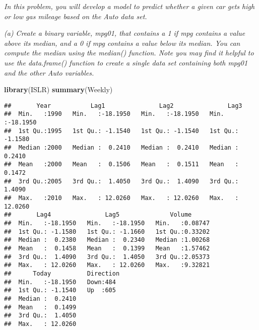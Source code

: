 \documentclass[]{article}
\newenvironment{Shaded}{\begin{snugshade}}{\end{snugshade}}
\newcommand{\KeywordTok}[1]{\textcolor[rgb]{0.13,0.29,0.53}{\textbf{#1}}}
\newcommand{\DecValTok}[1]{\textcolor[rgb]{0.00,0.00,0.81}{#1}}
\newcommand{\StringTok}[1]{\textcolor[rgb]{0.31,0.60,0.02}{#1}}
\newcommand{\OperatorTok}[1]{\textcolor[rgb]{0.81,0.36,0.00}{\textbf{#1}}}
\newcommand{\NormalTok}[1]{#1}
\begin{document}
 \emph{In this problem, you will develop a model to predict whether a
given car gets high or low gas mileage based on the Auto data set.}

\emph{(a) Create a binary variable, mpg01, that contains a 1 if mpg
contains a value above its median, and a 0 if mpg contains a value below
its median. You can compute the median using the median() function. Note
you may find it helpful to use the data.frame() function to create a
single data set containing both mpg01 and the other Auto variables.}

\begin{Shaded}
\begin{Highlighting}[]
\KeywordTok{library}\NormalTok{(ISLR)}
\KeywordTok{summary}\NormalTok{(Weekly)}
\end{Highlighting}
\end{Shaded}

\begin{verbatim}
##       Year           Lag1               Lag2               Lag3         
##  Min.   :1990   Min.   :-18.1950   Min.   :-18.1950   Min.   :-18.1950  
##  1st Qu.:1995   1st Qu.: -1.1540   1st Qu.: -1.1540   1st Qu.: -1.1580  
##  Median :2000   Median :  0.2410   Median :  0.2410   Median :  0.2410  
##  Mean   :2000   Mean   :  0.1506   Mean   :  0.1511   Mean   :  0.1472  
##  3rd Qu.:2005   3rd Qu.:  1.4050   3rd Qu.:  1.4090   3rd Qu.:  1.4090  
##  Max.   :2010   Max.   : 12.0260   Max.   : 12.0260   Max.   : 12.0260  
##       Lag4               Lag5              Volume       
##  Min.   :-18.1950   Min.   :-18.1950   Min.   :0.08747  
##  1st Qu.: -1.1580   1st Qu.: -1.1660   1st Qu.:0.33202  
##  Median :  0.2380   Median :  0.2340   Median :1.00268  
##  Mean   :  0.1458   Mean   :  0.1399   Mean   :1.57462  
##  3rd Qu.:  1.4090   3rd Qu.:  1.4050   3rd Qu.:2.05373  
##  Max.   : 12.0260   Max.   : 12.0260   Max.   :9.32821  
##      Today          Direction 
##  Min.   :-18.1950   Down:484  
##  1st Qu.: -1.1540   Up  :605  
##  Median :  0.2410             
##  Mean   :  0.1499             
##  3rd Qu.:  1.4050             
##  Max.   : 12.0260
\end{verbatim}

\begin{Shaded}
\end{Shaded}
\end{document}
